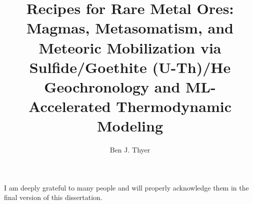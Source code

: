 \documentclass{caltech_thesis}
\title{Recipes for Rare Metal Ores: Magmas, Metasomatism, and Meteoric Mobilization 
via Sulfide/Goethite (U-Th)/He Geochronology and ML-Accelerated Thermodynamic Modeling}
\author{Ben J. Thyer}
\begin{document}

\frontmatter


\maketitle

\begin{abstract}

\end{abstract}

\begin{acknowledgements}

I am deeply grateful to many people and will properly acknowledge them in the final version of this dissertation. 

\end{acknowledgements}




\tableofcontents

\mainmatter



\end{document}
